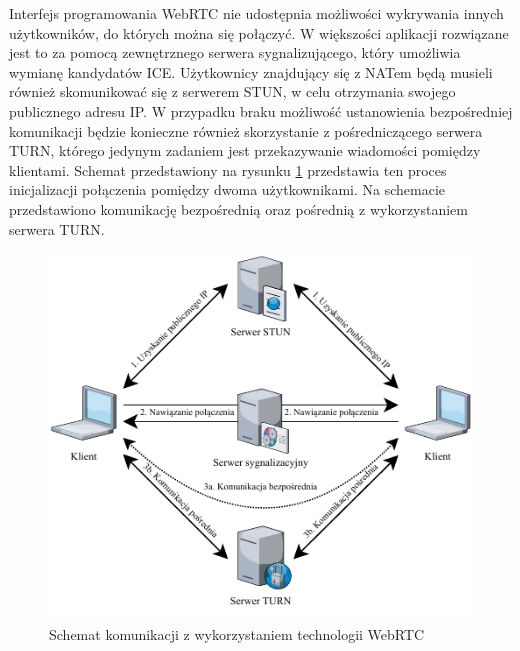 \documentclass[language=polish,type=master]{aghmodern}
\begin{document}
Interfejs programowania WebRTC nie udostępnia możliwości wykrywania innych użytkowników, do których można się połączyć.
W większości aplikacji rozwiązane jest to za pomocą zewnętrznego serwera sygnalizującego, który umożliwia wymianę kandydatów ICE\footnotemark{}.
Użytkownicy znajdujący się z NATem\footnotemark{} będą musieli również
skomunikować się z serwerem STUN\footnotemark{}, w celu otrzymania swojego publicznego adresu IP.
W przypadku braku możliwość ustanowienia bezpośredniej komunikacji będzie konieczne również skorzystanie z pośredniczącego serwera TURN\footnotemark{}, którego jedynym zadaniem jest przekazywanie wiadomości pomiędzy klientami.
Schemat przedstawiony na rysunku \ref{fig:webrtc} przedstawia ten proces inicjalizacji połączenia pomiędzy dwoma użytkownikami.
Na schemacie przedstawiono komunikację bezpośrednią oraz pośrednią z wykorzystaniem serwera TURN.

\begin{figure}[H]
    \centering
    \vspace*{15pt}
    \includegraphics[width=\textwidth]{images/webrtc.pdf}
    \caption{Schemat komunikacji z wykorzystaniem technologii WebRTC}
    \label{fig:webrtc}
\end{figure}
\end{document}
